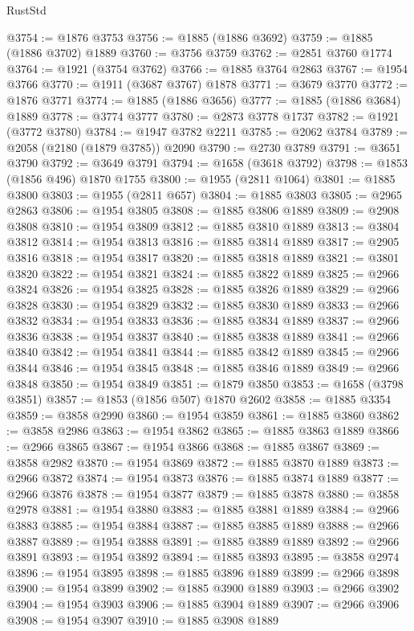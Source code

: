 \begin{lexlean}{RustStd}
\begin{coremodule}
{\begin{coremodule}
{{{{{{{{{{{{{{{{{{{{{{{{{{{{{@3754 := @1876 @3753
@3756 := @1885 (@1886 @3692)
@3759 := @1885 (@1886 @3702) @1889
@3760 := @3756 @3759
@3762 := @2851 @3760 @1774
@3764 := @1921 (@3754 @3762)
@3766 := @1885 @3764 @2863
@3767 := @1954 @3766
@3770 := @1911 (@3687 @3767) @1878
@3771 := @3679 @3770
@3772 := @1876 @3771
@3774 := @1885 (@1886 @3656)
@3777 := @1885 (@1886 @3684) @1889
@3778 := @3774 @3777
@3780 := @2873 @3778 @1737
@3782 := @1921 (@3772 @3780)
@3784 := @1947 @3782 @2211
@3785 := @2062 @3784
@3789 := @2058 (@2180 (@1879 @3785)) @2090
@3790 := @2730 @3789
@3791 := @3651 @3790
@3792 := @3649 @3791
@3794 := @1658 (@3618 @3792)
@3798 := @1853 (@1856 @496) @1870 @1755
@3800 := @1955 (@2811 @1064)
@3801 := @1885 @3800
@3803 := @1955 (@2811 @657)
@3804 := @1885 @3803
@3805 := @2965 @2863
@3806 := @1954 @3805
@3808 := @1885 @3806 @1889
@3809 := @2908 @3808
@3810 := @1954 @3809
@3812 := @1885 @3810 @1889
@3813 := @3804 @3812
@3814 := @1954 @3813
@3816 := @1885 @3814 @1889
@3817 := @2905 @3816
@3818 := @1954 @3817
@3820 := @1885 @3818 @1889
@3821 := @3801 @3820
@3822 := @1954 @3821
@3824 := @1885 @3822 @1889
@3825 := @2966 @3824
@3826 := @1954 @3825
@3828 := @1885 @3826 @1889
@3829 := @2966 @3828
@3830 := @1954 @3829
@3832 := @1885 @3830 @1889
@3833 := @2966 @3832
@3834 := @1954 @3833
@3836 := @1885 @3834 @1889
@3837 := @2966 @3836
@3838 := @1954 @3837
@3840 := @1885 @3838 @1889
@3841 := @2966 @3840
@3842 := @1954 @3841
@3844 := @1885 @3842 @1889
@3845 := @2966 @3844
@3846 := @1954 @3845
@3848 := @1885 @3846 @1889
@3849 := @2966 @3848
@3850 := @1954 @3849
@3851 := @1879 @3850
@3853 := @1658 (@3798 @3851)
@3857 := @1853 (@1856 @507) @1870 @2602
@3858 := @1885 @3354
@3859 := @3858 @2990
@3860 := @1954 @3859
@3861 := @1885 @3860
@3862 := @3858 @2986
@3863 := @1954 @3862
@3865 := @1885 @3863 @1889
@3866 := @2966 @3865
@3867 := @1954 @3866
@3868 := @1885 @3867
@3869 := @3858 @2982
@3870 := @1954 @3869
@3872 := @1885 @3870 @1889
@3873 := @2966 @3872
@3874 := @1954 @3873
@3876 := @1885 @3874 @1889
@3877 := @2966 @3876
@3878 := @1954 @3877
@3879 := @1885 @3878
@3880 := @3858 @2978
@3881 := @1954 @3880
@3883 := @1885 @3881 @1889
@3884 := @2966 @3883
@3885 := @1954 @3884
@3887 := @1885 @3885 @1889
@3888 := @2966 @3887
@3889 := @1954 @3888
@3891 := @1885 @3889 @1889
@3892 := @2966 @3891
@3893 := @1954 @3892
@3894 := @1885 @3893
@3895 := @3858 @2974
@3896 := @1954 @3895
@3898 := @1885 @3896 @1889
@3899 := @2966 @3898
@3900 := @1954 @3899
@3902 := @1885 @3900 @1889
@3903 := @2966 @3902
@3904 := @1954 @3903
@3906 := @1885 @3904 @1889
@3907 := @2966 @3906
@3908 := @1954 @3907
@3910 := @1885 @3908 @1889
}}}}}}}}}}}}}}}}}}}}}}}}}}}}}
\end{coremodule}}
\end{coremodule}
\end{lexlean}
